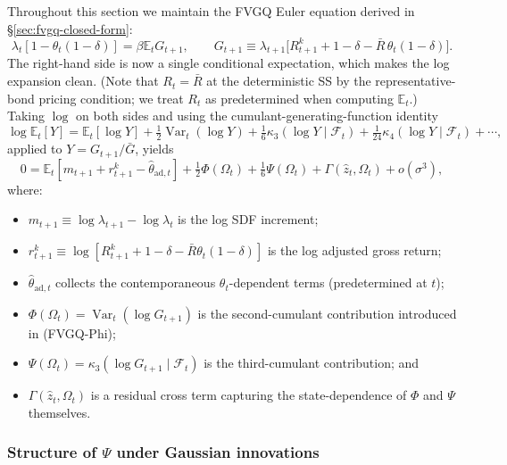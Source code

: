 \documentclass[11pt]{article}
\newcommand{\E}{\mathbb{E}}
\newcommand{\Var}{\operatorname{Var}}
\newcommand{\kcum}{\kappa}
\newcommand{\mc}[1]{\mathcal{#1}}
\theoremstyle{plain}
\theoremstyle{definition}
\begin{document}
Throughout this section we maintain the FVGQ Euler equation derived in
§\ref{sec:fvgq-closed-form}:
\begin{equation}
\lambda_t [1-\theta_t(1-\delta)]
= \beta\E_t G_{t+1},
\qquad
G_{t+1}\equiv \lambda_{t+1}\big[R^k_{t+1}+1-\delta -\bar R\,\theta_t(1-\delta)\big].
\tag{E-Euler-G}
\end{equation}
The right-hand side is now a single conditional expectation, which makes the
log expansion clean. (Note that $R_t=\bar R$ at the deterministic SS by the
representative-bond pricing condition; we treat $R_t$ as predetermined when
computing $\E_t$.) Taking $\log$ on both sides and using the
cumulant-generating-function identity
\[
\log\E_t[Y] = \E_t[\log Y]
+ \tfrac{1}{2}\Var_t(\log Y)
+ \tfrac{1}{6}\kcum_3(\log Y\mid \mc{F}_t)
+ \tfrac{1}{24}\kcum_4(\log Y\mid\mc{F}_t)
+ \cdots,
\]
applied to $Y=G_{t+1}/\bar G$, yields
\begin{equation}
0 = \E_t[m_{t+1}+r^k_{t+1}-\hat\theta_{\mathrm{ad},t}]
+\tfrac{1}{2}\Phi(\Omega_t)
+\tfrac{1}{6}\Psi(\Omega_t)
+\Gamma(\hat z_t,\Omega_t)
+ o(\sigma^3),
\tag{DGP-E3}
\end{equation}
where:
\begin{itemize}
  \item $m_{t+1}\equiv \log\lambda_{t+1}-\log\lambda_t$ is the log SDF
  increment;
  \item $r^k_{t+1}\equiv\log[R^k_{t+1}+1-\delta-\bar R\theta_t(1-\delta)]$ is
  the log adjusted gross return;
  \item $\hat\theta_{\mathrm{ad},t}$ collects the contemporaneous
  $\theta_t$-dependent terms (predetermined at $t$);
  \item $\Phi(\Omega_t)=\Var_t(\log G_{t+1})$ is the second-cumulant
  contribution introduced in (FVGQ-Phi);
  \item $\Psi(\Omega_t)=\kcum_3(\log G_{t+1}\mid\mc{F}_t)$ is the third-cumulant
  contribution; and
  \item $\Gamma(\hat z_t,\Omega_t)$ is a residual cross term capturing the
  state-dependence of $\Phi$ and $\Psi$ themselves.
\end{itemize}

\subsubsection*{Structure of $\Psi$ under Gaussian innovations}
\end{document}
